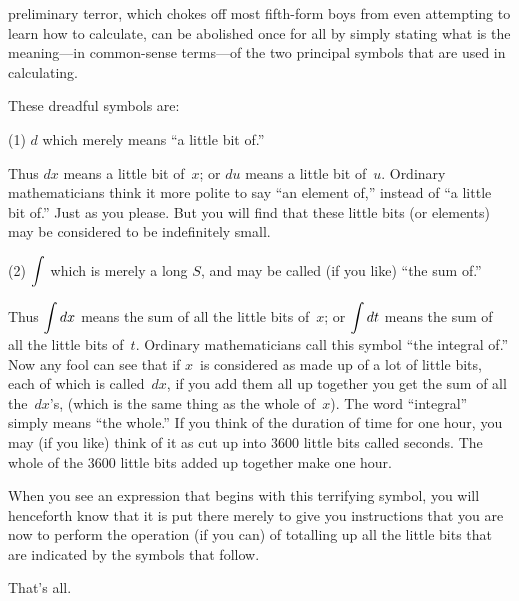 

 preliminary terror, which chokes off most fifth-form
boys from even attempting to learn how to
calculate, can be abolished once for all by simply stating
what is the meaning---in common-sense terms---of the
two principal symbols that are used in calculating.

These dreadful symbols are:

(1) $d$ which merely means ``a little bit of.''

Thus $dx$ means a little bit of~$x$; or $du$ means a
little bit of~$u$. Ordinary mathematicians think it
more polite to say ``an element of,'' instead of ``a little
bit of.'' Just as you please. But you will find that
these little bits (or elements) may be considered to be
indefinitely small.

(2) $\displaystyle\int$ which is merely a long $S$, and may be called
(if you like) ``the sum of.''

Thus $\displaystyle\int dx$ means the sum of all the little bits
of~$x$; or $\displaystyle\int dt$ means the sum of all the little bits
of~$t$. Ordinary mathematicians call this symbol ``the
%
integral of.'' Now any fool can see that if $x$~is
considered as made up of a lot of little bits, each of
which is called~$dx$, if you add them all up together
you get the sum of all the~$dx$'s, (which is the same
thing as the whole of~$x$). The word ``integral'' simply
means ``the whole.'' If you think of the duration
of time for one hour, you may (if you like) think of
it as cut up into $3600$ little bits called seconds. The
whole of the $3600$ little bits added up together make
one hour.

When you see an expression that begins with this
terrifying symbol, you will henceforth know that it
is put there merely to give you instructions that you
are now to perform the operation (if you can) of
totalling up all the little bits that are indicated by
the symbols that follow.

That's all.
%